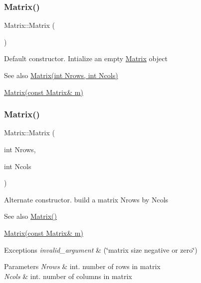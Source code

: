 \subsubsection{\texorpdfstring{Matrix()}{Matrix()}\hspace{0.1cm}{\footnotesize\ttfamily [1/3]}}
{\footnotesize\ttfamily Matrix\+::\+Matrix (\begin{DoxyParamCaption}{ }\end{DoxyParamCaption})}

Default constructor. Intialize an empty \hyperlink{class_matrix}{Matrix} object \begin{DoxySeeAlso}{See also}
\hyperlink{class_matrix_a135a15de1126d735bb95fcc839d739d7}{Matrix(int Nrows, int Ncols)} 

\hyperlink{class_matrix_a765f4dcb51b6829311cc3e7576388423}{Matrix(const Matrix\& m)} 
\end{DoxySeeAlso}
\mbox{\label{class_matrix_a135a15de1126d735bb95fcc839d739d7}} 
\subsubsection{\texorpdfstring{Matrix()}{Matrix()}\hspace{0.1cm}{\footnotesize\ttfamily [2/3]}}
{\footnotesize\ttfamily Matrix\+::\+Matrix (\begin{DoxyParamCaption}\item[{int}]{Nrows,  }\item[{int}]{Ncols }\end{DoxyParamCaption})}

Alternate constructor. build a matrix Nrows by Ncols \begin{DoxySeeAlso}{See also}
\hyperlink{class_matrix_a2dba13c45127354c9f75ef576f49269b}{Matrix()} 

\hyperlink{class_matrix_a765f4dcb51b6829311cc3e7576388423}{Matrix(const Matrix\& m)} 
\end{DoxySeeAlso}

\begin{DoxyExceptions}{Exceptions}
{\em invalid\+\_\+argument} & (\char`\"{}matrix size negative or zero\char`\"{}) \\
\hline
\end{DoxyExceptions}

\begin{DoxyParams}{Parameters}
{\em Nrows} & int. number of rows in matrix \\
\hline
{\em Ncols} & int. number of columns in matrix \\
\hline
\end{DoxyParams}
\mbox{\label{class_matrix_a765f4dcb51b6829311cc3e7576388423}} 

